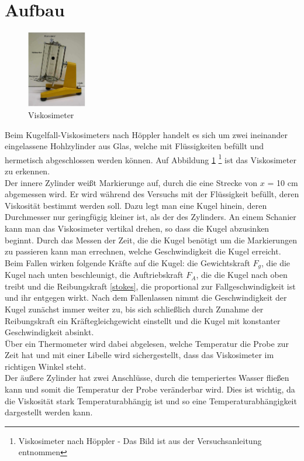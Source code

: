 	\section{Aufbau}
\begin{figure}
	\includegraphics[width=0.23\textwidth]{pics/aufbau.jpg}
	\caption{Viskosimeter}
	\label{aufbau}
\end{figure}

Beim Kugelfall-Viskosimeters nach Höppler handelt es sich um zwei ineinander eingelassene Hohlzylinder aus Glas, welche mit Flüssigkeiten befüllt und hermetisch abgeschlossen werden können. Auf Abbildung \ref{aufbau} \footnote{Viskosimeter nach Höppler - Das Bild ist aus der Versuchsanleitung entnommen} ist das Viskosimeter zu erkennen.\\
Der innere Zylinder weißt Markierunge auf, durch die eine Strecke von $x$ = 10 cm abgemessen wird. Er wird während des Versuchs mit der Flüssigkeit befüllt, deren Viskosität bestimmt werden soll. Dazu legt man eine Kugel hinein, deren Durchmesser nur geringfügig kleiner ist, als der des Zylinders. An einem Schanier kann man das Viskosimeter vertikal drehen, so dass die Kugel abzusinken beginnt. Durch das Messen der Zeit, die die Kugel benötigt um die Markierungen zu passieren kann man errechnen, welche Geschwindigkeit die Kugel erreicht.\\
Beim Fallen wirken folgende Kräfte auf die Kugel: die Gewichtskraft $F_g$, die die Kugel nach unten beschleunigt, die Auftriebskraft $F_A$, die die Kugel nach oben treibt und die Reibungskraft \eqref{stokes}, die proportional zur Fallgeschwindigkeit ist und ihr entgegen wirkt. Nach dem Fallenlassen nimmt die Geschwindigkeit der Kugel zunächst immer weiter zu, bis sich schließlich durch Zunahme der Reibungskraft ein Kräftegleichgewicht einstellt und die Kugel mit konstanter Geschwindigkeit absinkt.\\
Über ein Thermometer wird dabei abgelesen, welche Temperatur die Probe zur Zeit hat und mit einer Libelle wird sichergestellt, dass das Viskosimeter im richtigen Winkel steht.\\
Der äußere Zylinder hat zwei Anschlüsse, durch die temperiertes Wasser fließen kann und somit die Temperatur der Probe veränderbar wird. Dies ist wichtig, da die Viskosität stark Temperaturabhängig ist und so eine Temperaturabhängigkeit dargestellt werden kann. 

